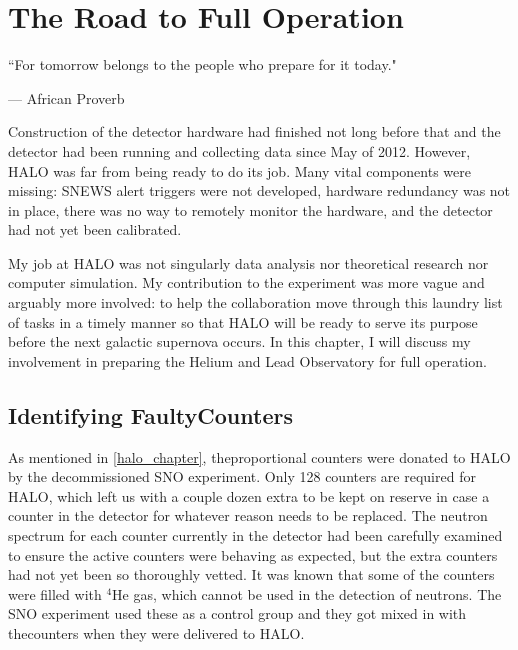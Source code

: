 %
%
%
%


\chapter{The Road to Full Operation}
	\label{halo2_chapter}

	\begin{quoting}
		\noindent \large ``For tomorrow belongs to the people who prepare for it today." \normalsize

		--- African Proverb
	\end{quoting}

	 Construction of the detector hardware had finished not long before that and the detector had been running and collecting data since May of 2012. However, HALO was far from being ready to do its job. Many vital components were missing: SNEWS alert triggers were not developed, hardware redundancy was not in place, there was no way to remotely monitor the hardware, and the detector had not yet been calibrated. 

	My job at HALO was not singularly data analysis nor theoretical research nor computer simulation. My contribution to the experiment was more vague and arguably more involved: to help the collaboration move through this laundry list of tasks in a timely manner so that HALO will be ready to serve its purpose before the next galactic supernova occurs. In this chapter, I will discuss my involvement in preparing the Helium and Lead Observatory for full operation.

	\section{Identifying Faulty{}\he Counters}
		As mentioned in \CHP \ref{halo_chapter}, the{}\he proportional counters were donated to HALO by the decommissioned SNO experiment. Only 128 counters are required for HALO, which left us with a couple dozen extra to be kept on reserve in case a counter in the detector for whatever reason needs to be replaced. The neutron spectrum for each counter currently in the detector had been carefully examined to ensure the active counters were behaving as expected, but the extra counters had not yet been so thoroughly vetted. It was known that some of the counters were filled with $^4$He gas, which cannot be used in the detection of neutrons. The SNO experiment used these as a control group and they got mixed in with the{}\he counters when they were delivered to HALO. 

